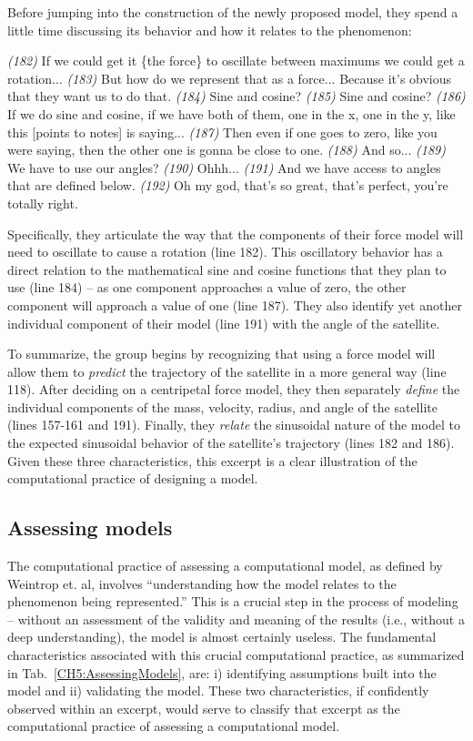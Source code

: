 \documentclass{msuphddissertation}
\begin{document}
\begin{doublespace}
Before jumping into the construction of the newly proposed model, they spend a little time discussing its behavior and how it relates to the phenomenon: \begin{description}
\SD \textit{(182)} If we could get it \{the force\} to oscillate between maximums we could get a rotation...
\SD \textit{(183)} But how do we represent that as a force... Because it's obvious that they want us to do that.
\SA \textit{(184)} Sine and cosine?
\SD \textit{(185)} Sine and cosine?
\SA \textit{(186)} If we do sine and cosine, if we have both of them, one in the x, one in the y, like this [points to notes] is saying...
\SA \textit{(187)} Then even if one goes to zero, like you were saying, then the other one is gonna be close to one.
\SA \textit{(188)} And so...
\SD \textit{(189)} We have to use our angles?
\SC \textit{(190)} Ohhh...
\SD \textit{(191)} And we have access to angles {that are defined below}.
\SD \textit{(192)} Oh my god, that’s so great, that’s perfect, you're totally right.
\end{description}  Specifically, they articulate the way that the components of their force model will need to oscillate to cause a rotation (line 182).  This oscillatory behavior has a direct relation to the mathematical sine and cosine functions that they plan to use (line 184) -- as one component approaches a value of zero, the other component will approach a value of one (line 187).  They also identify yet another individual component of their model (line 191) with the angle of the satellite.

To summarize, the group begins by recognizing that using a force model will allow them to \textit{predict} the trajectory of the satellite in a more general way (line 118).  After deciding on a centripetal force model, they then separately \textit{define} the individual components of the mass, velocity, radius, and angle of the satellite (lines 157-161 and 191).  Finally, they \textit{relate} the sinusoidal nature of the model to the expected sinusoidal behavior of the satellite's trajectory (lines 182 and 186).  Given these three characteristics, this excerpt is a clear illustration of the computational practice of designing a model.

\subsection{Assessing models}\label{CH5:SecAssessingModels}

The computational practice of assessing a computational model, as defined by Weintrop et. al, involves ``understanding how the model relates to the phenomenon being represented.''  This is a crucial step in the process of modeling -- without an assessment of the validity and meaning of the results (i.e., without a deep understanding), the model is almost certainly useless.  The fundamental characteristics associated with this crucial computational practice, as summarized in Tab.~\ref{CH5:AssessingModels}, are: i) identifying assumptions built into the model and ii) validating the model.  These two characteristics, if confidently observed within an excerpt, would serve to classify that excerpt as the computational practice of assessing a computational model.


\end{doublespace}
\end{document}
